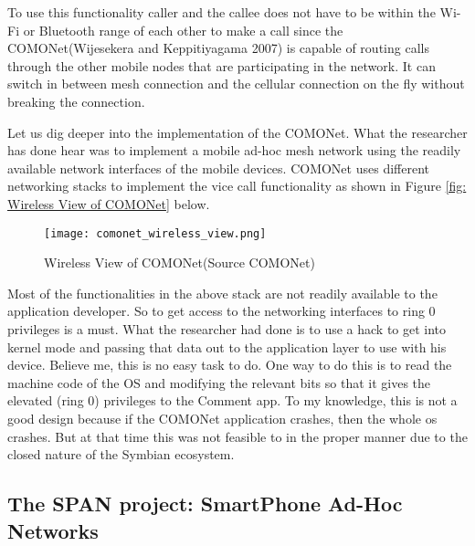\vspace{12pt}
\pagebreak
To use this functionality caller and the callee does not have to be within the Wi-Fi or Bluetooth range of each other to make a call since the COMONet(Wijesekera and Keppitiyagama 2007)\cite{comonet} is capable of routing calls through the other mobile nodes that are participating in the network. It can switch in between mesh connection and the cellular connection on the fly without breaking the connection.

\vspace{12pt}

Let us dig deeper into the implementation of the COMONet. What the researcher has done hear was to implement a mobile ad-hoc mesh network using the readily available network interfaces of the mobile devices. 
COMONet uses different networking stacks to implement the vice call functionality as shown in Figure \ref{fig: Wireless View of COMONet} below.
\vspace{12pt}

\begin{figure}[H]
    \centering
   \texttt{[image: comonet\_wireless\_view.png]}
    \caption{Wireless View of COMONet(Source COMONet\cite{comonet})}
    \label{fig:Wireless View of COMONet}
\end{figure}

\vspace{12pt}

Most of the functionalities in the above stack are not readily available to the application developer. So to get access to the networking interfaces to ring 0 privileges is a must.  What the researcher had done is to use a hack to get into kernel mode and passing that data out to the application layer to use with his device. Believe me, this is no easy task to do. One way to do this is to read the machine code of the OS and modifying the relevant bits so that it gives the elevated (ring 0) privileges to the Comment app. To my knowledge, this is not a good design because if the COMONet application crashes, then the whole os crashes. But at that time this was not feasible to in the proper manner due to the closed nature of the Symbian ecosystem.


\vspace{12pt}
\pagebreak
\subsection{The SPAN project: SmartPhone Ad-Hoc Networks}

